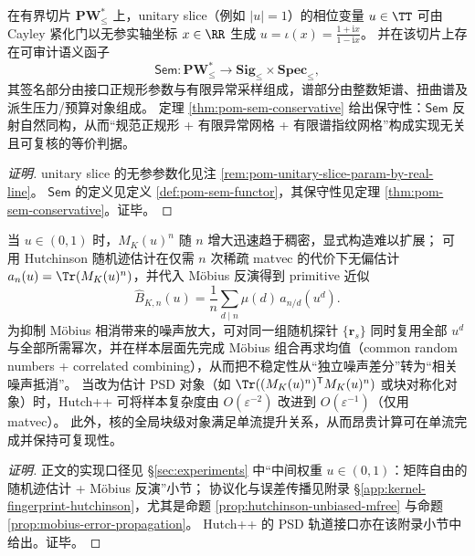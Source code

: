 \begin{conclusion}\label{con:xi-terminal-sem-conservative-unitary-slice}
在有界切片 \(\mathbf{PW}^{\ast}_{\le}\) 上，unitary slice（例如 \(|u|=1\)）的相位变量 \(u\in\TT\) 可由 Cayley 紧化门以无参实轴坐标 \(x\in\RR\) 生成
\(
u=\iota(x)=\frac{1+\mathrm{i}x}{1-\mathrm{i}x}
\)。
并在该切片上存在可审计语义函子
\[
\mathsf{Sem}:\mathbf{PW}^{\ast}_{\le}\longrightarrow \mathbf{Sig}_{\le}\times \mathbf{Spec}_{\le},
\]
其签名部分由接口正规形参数与有限异常采样组成，谱部分由整数矩谱、扭曲谱及派生压力/预算对象组成。
定理 \ref{thm:pom-sem-conservative} 给出保守性：\(\mathsf{Sem}\) 反射自然同构，从而“规范正规形 + 有限异常网格 + 有限谱指纹网格”构成实现无关且可复核的等价判据。
\end{conclusion}
\begin{proof}[证明]
unitary slice 的无参参数化见注 \ref{rem:pom-unitary-slice-param-by-real-line}。
\(\mathsf{Sem}\) 的定义见定义 \ref{def:pom-sem-functor}，其保守性见定理 \ref{thm:pom-sem-conservative}。证毕。
\end{proof}

\begin{conclusion}\label{con:xi-terminal-intermediate-u-mobius-hutchinson}
当 \(u\in(0,1)\) 时，\(M_K(u)^n\) 随 \(n\) 增大迅速趋于稠密，显式构造难以扩展；
可用 Hutchinson 随机迹估计在仅需 \(n\) 次稀疏 matvec 的代价下无偏估计
\(
a_n(u)=\Tr(M_K(u)^n)
\)，并代入 Möbius 反演得到 primitive 近似
\[
\widehat B_{K,n}(u)=\frac1n\sum_{d\mid n}\mu(d)\,\widehat a_{n/d}(u^d).
\]
为抑制 Möbius 相消带来的噪声放大，可对同一组随机探针 \(\{\mathbf r_s\}\) 同时复用全部 \(u^d\) 与全部所需幂次，并在样本层面先完成 Möbius 组合再求均值（common random numbers + correlated combining），从而把不稳定性从“独立噪声差分”转为“相关噪声抵消”。
当改为估计 PSD 对象（如 \(\Tr((M_K(u)^n)^{\mathsf T}M_K(u)^n)\) 或块对称化对象）时，Hutch++ 可将样本复杂度由 \(O(\varepsilon^{-2})\) 改进到 \(O(\varepsilon^{-1})\)（仅用 matvec）。
此外，核的全局块级对象满足单流提升关系，从而昂贵计算可在单流完成并保持可复现性。
\end{conclusion}
\begin{proof}[证明]
正文的实现口径见 \S\ref{sec:experiments} 中“中间权重 \(u\in(0,1)\)：矩阵自由的随机迹估计 + Möbius 反演”小节；
协议化与误差传播见附录 \S\ref{app:kernel-fingerprint-hutchinson}，尤其是命题 \ref{prop:hutchinson-unbiased-mfree} 与命题 \ref{prop:mobius-error-propagation}。
Hutch++ 的 PSD 轨道接口亦在该附录小节中给出。证毕。
\end{proof}

